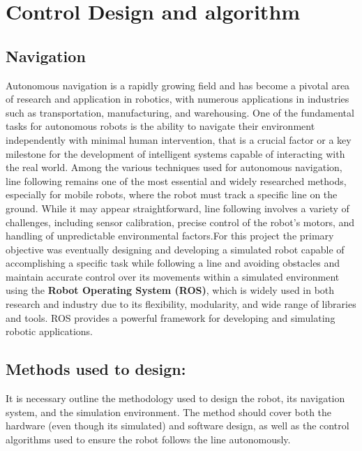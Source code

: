 \documentclass[../../main]{subfiles}
\begin{document}
\section{Control Design and algorithm}
\subsection{Navigation}
    Autonomous navigation is a rapidly growing field and has become a
    pivotal area of research and application in robotics, with numerous
    applications in industries such as transportation, manufacturing, and
    warehousing. One of the fundamental tasks for autonomous robots is the
    ability to navigate their environment independently with minimal human
    intervention, that is a crucial factor or a key milestone for the
    development of intelligent systems capable of interacting with the real
    world. Among the various techniques used for autonomous navigation, line
    following remains one of the most essential and widely researched
    methods, especially for mobile robots, where the robot must track a
    specific line on the ground. While it may appear straightforward, line
    following involves a variety of challenges, including sensor
    calibration, precise control of the robot's motors, and handling of
    unpredictable environmental factors.For this project the primary
    objective was eventually designing and developing a simulated robot
    capable of accomplishing a specific task while following a line and
    avoiding obstacles and maintain accurate control over its movements
    within a simulated environment using the \textbf{Robot Operating System
    (ROS)}, which is widely used in both research and industry due to its
    flexibility, modularity, and wide range of libraries and tools. ROS
    provides a powerful framework for developing and simulating robotic
    applications.
    
    
    \subsection*{Methods used to design:}

    
    It is necessary outline the methodology used to design the robot, its
    navigation system, and the simulation environment. The method should
    cover both the hardware (even though it\textquotesingle s simulated) and
    software design, as well as the control algorithms used to ensure the
    robot follows the line autonomously.
    
\end{document}
